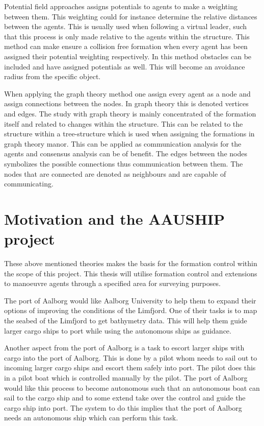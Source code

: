 \begin{description}[style=nextline]
	Potential field approaches assigns potentials to agents to make a weighting between them. This weighting could for instance determine the relative distances between the agents. This is usually used when following a virtual leader, such that this process is only made relative to the agents within the structure. This method can make ensure a collision free formation when every agent has been assigned their potential weighting respectively. In this method obstacles can be included and have assigned potentials as well. This will become an avoidance radius from the specific object.
	\item [Graph Theory Approaches]
	When applying the graph theory method one assign every agent as a node and assign connections between the nodes. In graph theory this is denoted vertices and edges. The study with graph theory is mainly concentrated of the formation itself and related to changes within the structure. This can be related to the structure within a tree-structure which is used when assigning the formations in graph theory manor. This can be applied as communication analysis for the agents and consensus analysis can be of benefit. The edges between the nodes symbolizes the possible connections thus communication between them. The nodes that are connected are denoted as neighbours and are capable of communicating.
\end{description}

\section{Motivation and the AAUSHIP project}
These above mentioned theories makes the basis for the formation control within the scope of this project. This thesis will utilise formation control and extensions to manoeuvre agents through a specified area for surveying purposes.

The port of Aalborg would like Aalborg University to help them to expand their options of improving the conditions of the Limfjord. One of their tasks is to map the seabed of the Limfjord to get bathymetry data. This will help them guide larger cargo ships to port while using the autonomous ships as guidance.

Another aspect from the port of Aalborg is a task to escort larger ships with cargo into the port of Aalborg. This is done by a pilot whom needs to sail out to incoming larger cargo ships and escort them safely into port. The pilot does this in a pilot boat which is controlled manually by the pilot. The port of Aalborg would like this process to become autonomous such that an autonomous boat can sail to the cargo ship and to some extend take over the control and guide the cargo ship into port. The system to do this implies that the port of Aalborg needs an autonomous ship which can perform this task.


